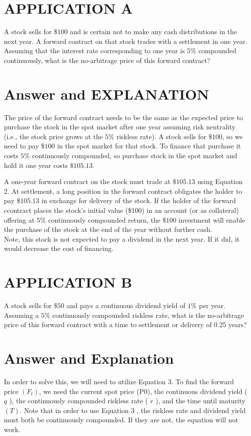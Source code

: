 \documentclass[11pt]{article}
\begin{document}
\section*{APPLICATION A}
A stock sells for $\$ 100$ and is certain not to make any cash distributions in the next year. A forward contract on that stock trades with a settlement in one year. Assuming that the interest rate corresponding to one year is $5 \%$ compounded continuously, what is the no-arbitrage price of this forward contract?

\section*{Answer and EXPLANATION}
The price of the forward contract needs to be the same as the expected price to purchase the stock in the spot market after one year assuming risk neutrality (i.e., the stock price grows at the $5 \%$ riskless rate). A stock sells for $\$ 100$, so we need to pay $\$ 100$ in the spot market for that stock. To finance that purchase it costs $5 \%$ continuously compounded, so purchase stock in the spot market and hold it one year costs $\$ 105.13$.

A one-year forward contract on the stock must trade at $\$ 105.13$ using Equation 2. At settlement, a long position in the forward contract obligates the holder to pay $\$ 105.13$ in exchange for delivery of the stock. If the holder of the forward ccontract places the stock's initial value (\$100) in an account (or as collateral) offering at $5 \%$ continuously compounded return, the $\$ 100$ investment will enable the purchase of the stock at the end of the year without further cash.\\
Note, this stock is not expected to pay a dividend in the next year. If it did, it would decrease the cost of financing.

\section*{APPLICATION B}
A stock sells for $\$ 50$ and pays a continuous dividend yield of $1 \%$ per year. Assuming a $5 \%$ continuously compounded riskless rate, what is the no-arbitrage price of this forward contract with a time to settlement or delivery of 0.25 years?

\section*{Answer and Explanation}
In order to solve this, we will need to utilize Equation 3. To find the forward price $\left(F_{t}\right)$, we need the current spot price (P0), the continuous dividend yield ( $q$ ), the continuously compounded riskless rate ( $r$ ), and the time until maturity $(T)$. Note that in order to use Equation 3 , the riskless rate and dividend yield must both be continuously compounded. If they are not, the equation will not work.
\end{document}
